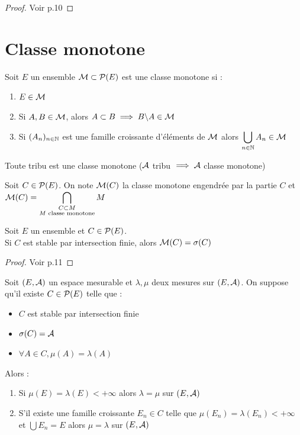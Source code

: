 \documentclass[]{report}
\begin{document}
\begin{proof}
    Voir p.10
\end{proof}

\section{Classe monotone}

\begin{df}
    Soit $E$ un ensemble $\mathcal{M}\subset \mathcal{P}(E)$ est une classe monotone si :
    \begin{enumerate}
        \item $E\in\mathcal{M}$
        \item Si $A,B\in\mathcal{M}$, alors $A\subset B\implies B\backslash A\in\mathcal{M}$
        \item Si $(A_n)_{{n\in\mathbb{N}}}$ est une famille croissante d'éléments de $\mathcal{M}$ alors $\displaystyle{\bigcup_{{n\in\mathbb{N}}}A_n\in\mathcal{M}}$
    \end{enumerate}
\end{df}

\begin{prop}
    Toute tribu est une classe monotone ($\mathcal{A}$ tribu $\implies \mathcal{A}$ classe monotone)
\end{prop}

\begin{df}
    Soit $C\in\mathcal{P}(E)$. On note $\mathcal{M}(C)$ la classe monotone engendrée par la partie $C$ et $\displaystyle{\mathcal{M}(C)=\bigcap_{\substack{C\subset M\\ M\text{ classe monotone}}}M}$
\end{df}

\begin{tm}
    Soit $E$ un ensemble et $C\in\mathcal{P}(E)$.\\
    Si $C$ est stable par intersection finie, alors $\mathcal{M}(C)=\sigma(C)$
\end{tm}

\begin{proof}
    Voir p.11
\end{proof}

\begin{tm}
    Soit $(E,\mathcal{A})$ un espace mesurable et $\lambda,\mu$ deux mesures sur $(E,\mathcal{A})$. On suppose qu'il existe $C\in\mathcal{P}(E)$ telle que :
    \begin{itemize}
        \item $C$ est stable par intersection finie
        \item $\sigma(C)=\mathcal{A}$
        \item $\forall A\in C,\mu(A)=\lambda(A)$
    \end{itemize}
    Alors :
    \begin{enumerate}
        \item Si $\mu(E)=\lambda(E)<+\infty$ alors $\lambda=\mu$ sur $(E,\mathcal{A})$
        \item S'il existe une famille croissante $E_n\in C$ telle que $\mu(E_n)=\lambda(E_n)<+\infty$ et $\bigcup E_n=E$ alors $\mu=\lambda$ sur $(E,\mathcal{A})$
    \end{enumerate}
\end{tm}
\end{document}
